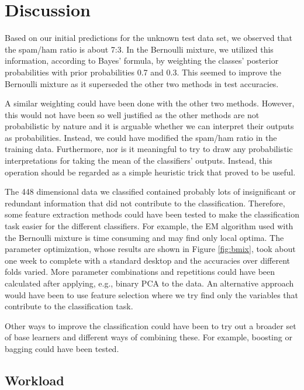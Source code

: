 \section{Discussion} \label{sec:discussion}

Based on our initial predictions for the unknown test data set, we observed that the spam/ham ratio is about 7:3. In the Bernoulli mixture, we utilized this information, according to Bayes' formula, by weighting the classes' posterior probabilities with prior probabilities 0.7 and 0.3. This seemed to improve the Bernoulli mixture as it superseded the other two methods in test accuracies.

A similar weighting could have been done with the other two methods. However, this would not have been so well justified as the other methods are not probabilistic by nature and it is arguable whether we can interpret their outputs as probabilities. Instead, we could have modified the spam/ham ratio in the training data. Furthermore, nor is it meaningful to try to draw any probabilistic interpretations for taking the mean of the classifiers' outputs. Instead, this operation should be regarded as a simple heuristic trick that proved to be useful.

The 448 dimensional data we classified contained probably lots of insignificant or redundant information that did not contribute to the classification. Therefore, some feature extraction methods could have been tested to make the classification task easier for the different classifiers. For example, the EM algorithm used with the Bernoulli mixture is time consuming and may find only local optima. The parameter optimization, whose results are shown in Figure \ref{fig:bmix}, took about one week to complete with a standard desktop and the accuracies over different folds varied. More parameter combinations and repetitions could have been calculated after applying, e.g., binary PCA to the data. An alternative approach would have been to use feature selection where we try find only the variables that contribute to the classification task.

Other ways to improve the classification could have been to try out a broader set of base learners and different ways of combining these. For example, boosting or bagging could have been tested.

\subsection{Workload}

